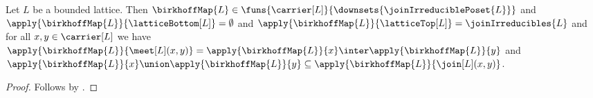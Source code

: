 \begin{theorem}\label{birkhoff_map_basic_laws}
    Let $L$ be a bounded lattice.
    Then $\birkhoffMap{L}\in
        \funs{\carrier[L]}{\downsets{\joinIrreduciblePoset{L}}}$ and
        $\apply{\birkhoffMap{L}}{\latticeBottom[L]}=\emptyset$ and
        $\apply{\birkhoffMap{L}}{\latticeTop[L]}=\joinIrreducibles{L}$ and
        for all $x,y\in\carrier[L]$ we have
            $\apply{\birkhoffMap{L}}{\meet[L](x,y)}
                =\apply{\birkhoffMap{L}}{x}\inter\apply{\birkhoffMap{L}}{y}$ and
            $\apply{\birkhoffMap{L}}{x}\union\apply{\birkhoffMap{L}}{y}
                \subseteq\apply{\birkhoffMap{L}}{\join[L](x,y)}$.
\end{theorem}
\begin{proof}
    Follows by
        .
\end{proof}

